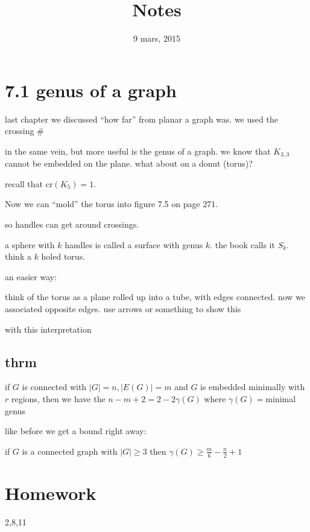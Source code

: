 \documentclass[letterpaper]{article}
\begin{document}
\title{Notes}
\date{9 mars, 2015}
\maketitle
\section*{7.1 genus of a graph}
last chapter we discussed ``how far'' from planar a graph was. we used the crossing \#

in the same vein, but more useful is the genus of a graph. we know that $K_{3,3}$ cannot be embedded on the plane. what about on a donut (torus)?

recall that $\text{cr}(K_5)=1$.

Now we can ``mold'' the torus into figure 7.5 on page 271.

so handles can get around crossings.

a sphere with $k$ handles is called a surface with genus $k$. the book calls it $S_k$. think a $k$ holed torus. 

an easier way:

think of the torus as a plane rolled up into a tube, with edges connected. now we associated  opposite edges. use arrows or something to show this

with this interpretation

\subsection*{thrm}
if $G$ is connected with $|G|=n, |E(G)|=m$ and $G$ is embedded minimally with $r$ regions, then we have the $n-m+2=2-2\gamma(G)$ where $\gamma(G)=$minimal genus

like before we get a bound right away:

if $G$ is a connected graph with $|G|\ge 3$ then $\gamma(G)\ge \frac{m}{6}-\frac{n}{2}+1$

\section*{Homework}
2,8,11
\end{document}
